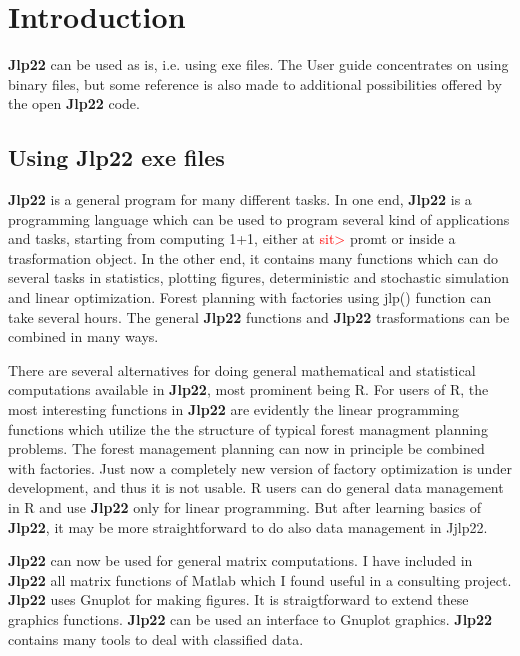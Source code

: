 \section{Introduction}
\label{intro}
\textbf{Jlp22} can be used as is, i.e. using exe files. The User guide concentrates
on using binary files, but some reference is also made to additional possibilities offered
by the open \textbf{Jlp22} code.
\subsection{Using \textbf{Jlp22} exe files}
\label{intro1}
\textbf{Jlp22} is a general program for many different tasks. In one end, \textbf{Jlp22} is a programming language which
can be used to program several kind of applications and tasks, starting from computing 1+1, either
at \textcolor{Red}{sit>} promt or inside a trasformation object.
In the other end, it contains many functions which
can do several tasks in statistics, plotting figures,
deterministic and stochastic simulation and linear optimization. Forest planning with factories
using \textcolor{VioletRed}{jlp}() function can take several hours.
The general \textbf{Jlp22} functions and \textbf{Jlp22} trasformations can be combined in many ways.

There are several alternatives for doing general mathematical and statistical
computations available in \textbf{Jlp22}, most prominent being R. For  users of R, the most interesting
functions in \textbf{Jlp22} are evidently the linear programming functions which utilize the the structure
of typical forest managment planning problems. The forest management planning can now
in principle be combined with factories. Just now a completely new version of factory optimization
is under development, and thus it is not usable. R users can do general data management in R and use
\textbf{Jlp22} only for linear programming. But after learning basics of \textbf{Jlp22}, it may be more
straightforward to do also data management in Jjlp22.

\textbf{Jlp22} can now be used for general matrix computations. I have included in \textbf{Jlp22} all matrix functions of
Matlab which I found useful in a consulting project. \textbf{Jlp22} uses Gnuplot for making figures.
It is straigtforward to extend these graphics functions. \textbf{Jlp22} can be used an
interface to Gnuplot graphics.  \textbf{Jlp22} contains many tools to deal with classified data.
